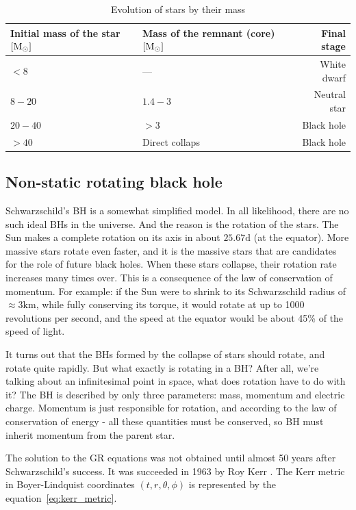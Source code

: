 \documentclass[fleqn,usenatbib]{mnras}
\begin{document}
\begin{table} %
	\centering
    \caption{Evolution of stars by their mass}
    \begin{tabular}{l l r}
        \hline
        Initial mass of the star $[\textup{M}_\odot]$ & Mass of the remnant (core) $[\textup{M}_\odot]$ & Final stage \\
        \hline
        $< 8$  & ---  & White dwarf \\
        $8 - 20$  & $1.4 - 3$ & Neutral star \\
        $20 - 40$  & $> 3$ & Black hole \\
        $> 40$ & Direct collaps & Black hole \\
        \hline
    \end{tabular}
	\label{tab:masses}
\end{table}

\subsection{Non-static rotating black hole}

Schwarzschild's BH is a somewhat simplified model. In all likelihood, there are no such ideal BHs in the universe. And the reason is the rotation of the stars. The Sun makes a complete rotation on its axis in about $25.67 \text{d}$ (at the equator). More massive stars rotate even faster, and it is the massive stars that are candidates for the role of future black holes. When these stars collapse, their rotation rate increases many times over. This is a consequence of the law of conservation of momentum. For example: if the Sun were to shrink to its Schwarzschild radius of $\approx 3\text{km}$, while fully conserving its torque, it would rotate at up to 1000 revolutions per second, and the speed at the equator would be about 45\% of the speed of light.  

It turns out that the BHs formed by the collapse of stars should rotate, and rotate quite rapidly. But what exactly is rotating in a BH? After all, we're talking about an infinitesimal point in space, what does rotation have to do with it? The BH is described by only three parameters: mass, momentum and electric charge. Momentum is just responsible for rotation, and according to the law of conservation of energy - all these quantities must be conserved, so BH must inherit momentum from the parent star. 

The solution to the GR equations was not obtained until almost 50 years after Schwarzschild's success. It was succeeded in 1963 by Roy Kerr \citet{kerr1963}. The Kerr metric in Boyer-Lindquist coordinates $(t, r, \theta, \phi)$ is represented by the equation~\ref{eq:kerr_metric}.
\end{document}
